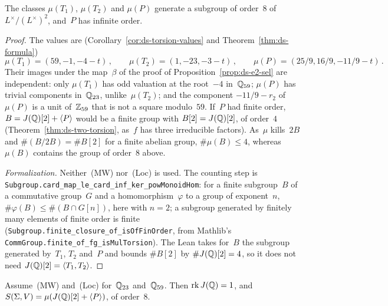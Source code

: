 \begin{lemma}
\label{lem:ds-e2-points}
\leanok
{}
The classes $\mu(T_1)$, $\mu(T_2)$ and $\mu(P)$ generate a subgroup of order~$8$
of~$L^\times/(L^\times)^2$, and~$P$ has infinite order.
\end{lemma}

\begin{proof}
\leanok
{}
The values are (Corollary~\ref{cor:ds-torsion-values} and Theorem~\ref{thm:ds-formula})
\[ \mu(T_1) = (59, -1, -4 - t)\,, \qquad \mu(T_2) = (1, -23, -3 - t)\,, \qquad
   \mu(P) = (25/9, 16/9, -11/9 - t)\,. \]
Their images under the map~$\beta$ of the proof of Proposition~\ref{prop:ds-e2-sel} are
independent: only $\mu(T_1)$ has odd valuation at the root~$-4$ in~$\mathbb{Q}_{59}$; $\mu(P)$ has trivial
components in~$\mathbb{Q}_{23}$, unlike~$\mu(T_2)$; and the component $-11/9 - r_2$ of~$\mu(P)$ is a unit
of~$\mathbb{Z}_{59}$ that is not a square modulo~$59$. If~$P$ had finite order,
$B = J(\mathbb{Q})[2] + \langle P\rangle$ would be a finite group with $B[2] = J(\mathbb{Q})[2]$, of order~$4$
(Theorem~\ref{thm:ds-two-torsion}, as~$f$ has three irreducible factors). As~$\mu$ kills~$2B$ and
$\#(B/2B) = \#B[2]$ for a finite abelian group, $\#\mu(B) \le 4$, whereas~$\mu(B)$ contains the
group of order~$8$ above.

\emph{Formalization.} Neither~(MW) nor~(Loc) is used. The counting step is
\texttt{Subgroup.card\_map\_le\_card\_inf\_ker\_powMonoidHom}: for a finite subgroup~$B$ of a
commutative group~$G$ and a homomorphism~$\varphi$ to a group of exponent~$n$,
$\#\varphi(B) \le \#(B \cap G[n])$, here with $n = 2$; a subgroup generated by finitely many
elements of finite order is finite (\texttt{Subgroup.finite\_closure\_of\_isOfFinOrder}, from
Mathlib's \texttt{CommGroup.finite\_of\_fg\_isMulTorsion}). The Lean takes for~$B$ the subgroup
generated by~$T_1$, $T_2$ and~$P$ and bounds $\#B[2]$ by $\#J(\mathbb{Q})[2] = 4$, so it does not need
$J(\mathbb{Q})[2] = \langle T_1, T_2\rangle$.
\end{proof}

\begin{theorem}[E2]
\label{thm:ds-e2}
\leanok
{}
Assume~(MW) and~(Loc) for~$\mathbb{Q}_{23}$ and~$\mathbb{Q}_{59}$. Then $\operatorname{rk} J(\mathbb{Q}) = 1$, and
$S(\Sigma, V) = \mu(J(\mathbb{Q})[2] + \langle P\rangle)$, of order~$8$.
\end{theorem}

